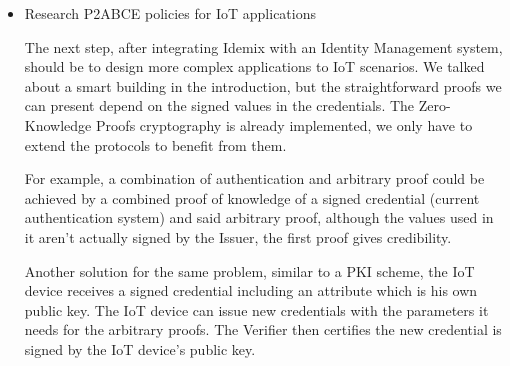 \begin{itemize}
	\item Research P2ABCE policies for IoT applications
	
	The next step, after integrating Idemix with an Identity Management system, should be to design more complex applications to IoT scenarios. We talked about a smart building in the introduction, but the straightforward proofs we can present depend on the signed values in the credentials. The Zero-Knowledge Proofs cryptography is already implemented, we only have to extend the protocols to benefit from them.
	
	For example, a combination of authentication and arbitrary proof could be achieved by a combined proof of knowledge of a signed credential (current authentication system) and said arbitrary proof, although the values used in it aren't actually signed by the Issuer, the first proof gives credibility.
	
	Another solution for the same problem, similar to a PKI scheme, the IoT device receives a signed credential including an attribute which is his own public key. The IoT device can issue new credentials with the parameters it needs for the arbitrary proofs. The Verifier then certifies the new credential is signed by the IoT device's public key.
	
\end{itemize}


